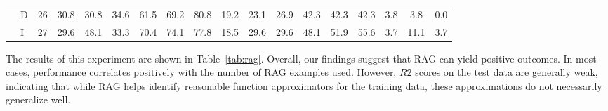 \documentclass{article}
\begin{document}
\begin{table*}[]
\begin{tabular}{|ll|c|ccc|cccccc|cccccc|}
\multicolumn{1}{|l|}{}                          & D & 26  & 30.8             & 30.8            & 34.6            & 61.5 & 69.2 & \multicolumn{1}{c|}{80.8} & 19.2    & 23.1   & 26.9   & 42.3 & 42.3 & \multicolumn{1}{c|}{42.3} & 3.8    & 3.8     & 0.0    \\
\multicolumn{1}{|l|}{}                          & I & 27  & 29.6             & 48.1            & 33.3            & 70.4 & 74.1 & \multicolumn{1}{c|}{77.8} & 18.5    & 29.6   & 29.6   & 48.1 & 51.9 & \multicolumn{1}{c|}{55.6} & 3.7    & 11.1    & 3.7    \\ \hline
\end{tabular}
\end{table*}

The results of this experiment are shown in Table~\ref{tab:rag}. 
Overall, our findings suggest that RAG can yield positive outcomes. 
In most cases, performance correlates positively with the number of RAG examples used. 
However, $R2$ scores on the test data are generally weak, indicating that while RAG helps identify reasonable function approximators for the training data, these approximations do not necessarily generalize well.
\end{document}
